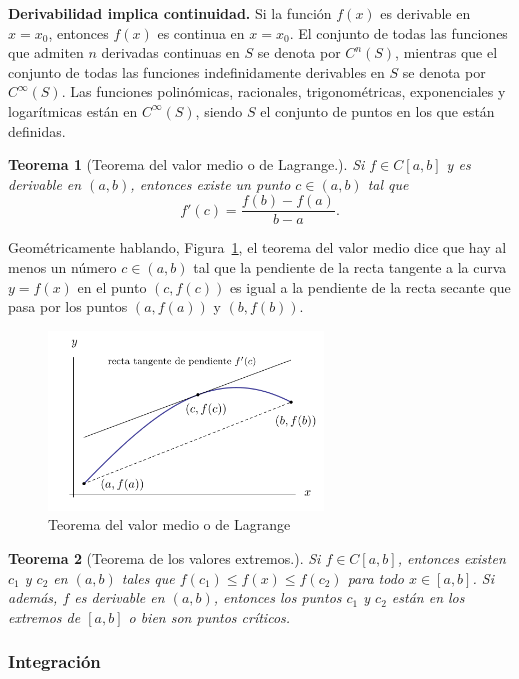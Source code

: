 \documentclass[12pt]{article}
\newtheorem{Teo}{Teorema}
\begin{document}
\textbf{Derivabilidad implica continuidad.} Si la función $f(x)$ es derivable en $x = x_0$, entonces $f(x)$ es continua en $x = x_0$. El conjunto de todas las funciones que admiten $n$ derivadas continuas en $S $ se denota por $C^n(S)$, mientras que el conjunto de todas las funciones indefinidamente derivables en $S$ se denota por $C^\infty(S)$. Las funciones polinómicas, racionales, trigonométricas, exponenciales y logarítmicas están en $C^\infty(S)$, siendo $S$ el conjunto de puntos en los que están definidas.

\begin{Teo}[Teorema del valor medio o de Lagrange.]
Si $f\in C[a, b]$ y es derivable en $(a,b)$, entonces existe un punto $c\in (a,b)$ tal que
$$f'(c) = \frac{f(b) - f(a)}{b - a}.$$
\end{Teo}

Geométricamente hablando, Figura~\ref{fig:lagrange}, el teorema del valor medio dice que hay al menos un número $c \in (a, b) $ tal que la pendiente de la recta tangente a la curva $y = f(x) $ en el punto $(c, f(c)) $ es igual a la pendiente de la recta secante que pasa por los puntos $(a, f(a)) $ y $(b, f(b)) $.

\begin{figure}[H]
\centering
\includegraphics[width=0.65\textwidth]{Fig3.png}
\caption{Teorema del valor medio o de Lagrange}
\label{fig:lagrange}
\end{figure}

\begin{Teo}[Teorema de los valores extremos.]  
Si $f \in C[a,b] $, entonces existen $c_1 $ y $c_2 $ en $(a,b) $ tales que $f(c_1) \leq f(x) \leq f(c_2) $ para todo $x \in [a,b] $. Si además, $f $ es derivable en $(a,b) $, entonces los puntos $c_1 $ y $c_2 $ están en los extremos de $[a,b] $ o bien son puntos críticos.
\end{Teo}

\subsubsection{Integración}
\end{document}
